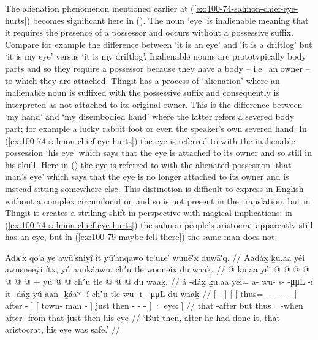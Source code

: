 The alienation phenomenon mentioned earlier at (\ref{ex:100-74-salmon-chief-eye-hurts}) becomes significant here in (\lastx).
The noun  ‘eye’ is inalienable meaning that it requires the presence of a possessor and occurs without a possessive suffix.
Compare for example the difference between  ‘it is an eye’ and  ‘it is a driftlog’ but  ‘it is my eye’ versus  ‘it is my driftlog’.
Inalienable nouns are prototypically body parts and so they require a possessor because they have a body – i.e.\ an owner – to which they are attached.
Tlingit has a process of ‘alienation’ where an inalienable noun is suffixed with the possessive suffix and consequently is interpreted as not attached to its original owner.
This is the difference between  ‘my hand’ and  ‘my disembodied hand’ where the latter refers a severed body part; for example a lucky rabbit foot or even the speaker’s own severed hand.
In (\ref{ex:100-74-salmon-chief-eye-hurts}) the eye is referred to with the inalienable possession  ‘his eye’ which says that the eye is attached to its owner and so still in his skull.
Here in (\lastx) the eye is referred to with the alienated possession  ‘that man’s eye’ which says that the eye is no longer attached to its owner and is instead sitting somewhere else.
This distinction is difficult to express in English without a complex circumlocution and so is not present in the translation, but in Tlingit it creates a striking shift in perspective with magical implications: in (\ref{ex:100-74-salmon-chief-eye-hurts}) the salmon people’s aristocrat apparently still has an eye, but in (\ref{ex:100-79-maybe-fell-there}) the same man does not.

\ex\label{ex:100-80-fixed-and-safe}%
%
\begingl
	\glpreamble	Adᴀ′x qo′a ye awū′sniỵî ît yū′anqawo tc!uʟe′ wunē′x duwā′q. //
	\glpreamble	Aadáx̱ ḵu.aa yéi awusneeÿí ítx̱, yú aanḵáawu, chʼu tle wooneix̱ du waaḵ. //
	\gla	{}  @ {} {} ḵu.aa 
		{} {} yéi @  @ {} @ {} @ {} @ {} @ {} {} 
			 @ {} {} +
		{} yú  @ {} @ {} {} 
		chʼu tle  @ {} @ {} @ {}
		{} du waaḵ. {} //
	\glb	{} á -dáx̱ {} ḵu.aa 
		{} {} yéi= a- wu- s-  -μμL -í {} 
			ít -dáx̱ {} 
		{} yú aan- ḵáaʷ -í {} 
		chʼu tle wu- i-  -μμL
		{} du waaḵ {} //
	\glc	{}[  - {}] 
		{}[ {}[ thus= - - -  - - {}]
				after - {}]
		{}[  town- man - {}]
		just then - -  -
		{}[ · eye: {}] //
	\gld	{} that -after {} but
		{} {} thus=  {} {} {} {} -when {} after -from {}
		{} that  {} {} {}
		just then  {} {} {}
		{} his eye {} //
	\glft	‘But then, after he had done it, that aristocrat, his eye was safe.’
		//
\endgl
\xe

